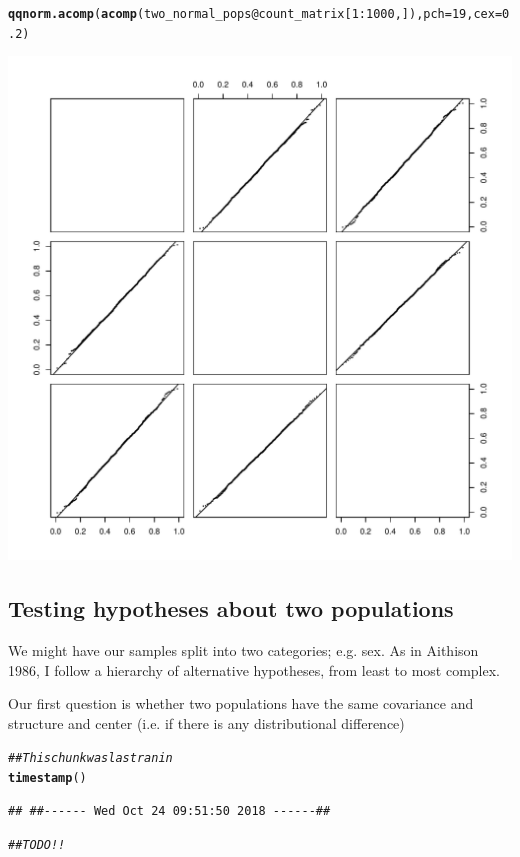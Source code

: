 \documentclass{article}\usepackage[]{graphicx}\usepackage[]{color}
\makeatletter
\def\maxwidth{ %
  \ifdim\Gin@nat@width>\linewidth
    \linewidth
  \else
    \Gin@nat@width
  \fi
}
\newcommand{\hlnum}[1]{\textcolor[rgb]{0.686,0.059,0.569}{#1}}%
\newcommand{\hlcom}[1]{\textcolor[rgb]{0.678,0.584,0.686}{\textit{#1}}}%
\newcommand{\hlopt}[1]{\textcolor[rgb]{0,0,0}{#1}}%
\newcommand{\hlstd}[1]{\textcolor[rgb]{0.345,0.345,0.345}{#1}}%
\newcommand{\hlkwc}[1]{\textcolor[rgb]{0.333,0.667,0.333}{#1}}%
\newcommand{\hlkwd}[1]{\textcolor[rgb]{0.737,0.353,0.396}{\textbf{#1}}}%
\newenvironment{kframe}{%
 \def\at@end@of@kframe{}%
 \ifinner\ifhmode%
  \def\at@end@of@kframe{\end{minipage}}%
  \begin{minipage}{\columnwidth}%
 \fi\fi%
 \def\FrameCommand##1{\hskip\@totalleftmargin \hskip-\fboxsep
 \colorbox{shadecolor}{##1}\hskip-\fboxsep
     \hskip-\linewidth \hskip-\@totalleftmargin \hskip\columnwidth}%
 \MakeFramed {\advance\hsize-\width
   \@totalleftmargin\z@ \linewidth\hsize
   \@setminipage}}%
 {\par\unskip\endMakeFramed%
 \at@end@of@kframe}
\newenvironment{knitrout}{}{} %
\makeatother
\begin{document}
\begin{enumerate}
\begin{knitrout}
\begin{kframe}
\begin{alltt}
\hlkwd{qqnorm.acomp}\hlstd{(}\hlkwd{acomp}\hlstd{(two_normal_pops}\hlopt{@}\hlkwc{count_matrix}\hlstd{[}\hlnum{1}\hlopt{:}\hlnum{1000}\hlstd{,]),} \hlkwc{pch}\hlstd{=}\hlnum{19}\hlstd{,} \hlkwc{cex}\hlstd{=}\hlnum{0.2}\hlstd{)}
\end{alltt}
\end{kframe}
\includegraphics[width=\maxwidth]{figure/unnamed-chunk-7-2} 

\end{knitrout}
\end{enumerate}

\clearpage

\subsection{Testing hypotheses about two populations}
We might have our samples split into two categories; e.g. sex. As in Aithison 1986\cite{}, I follow a hierarchy of alternative hypotheses, from least to most complex.

Our first question is whether two populations have the same covariance and structure and center (i.e. if there is any distributional difference)

\begin{knitrout}
\color{fgcolor}\begin{kframe}
\begin{alltt}
\hlcom{## This chunk was last ran in}
\hlkwd{timestamp}\hlstd{()}
\end{alltt}
\begin{verbatim}
## ##------ Wed Oct 24 09:51:50 2018 ------##
\end{verbatim}
\begin{alltt}
\hlcom{##TODO!!}
\end{alltt}
\end{kframe}
\end{knitrout}
\end{document}
